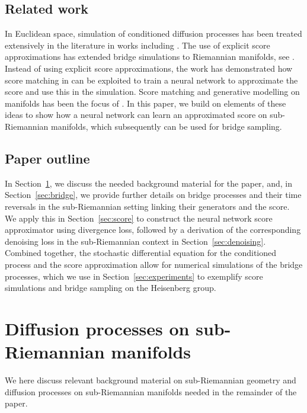 \documentclass[10pt]{amsart}
\theoremstyle{remark}
\numberwithin{equation}{section}
\begin{document}
\subsection{Related work}
In Euclidean space, simulation of conditioned diffusion processes has been treated extensively in the literature in works including \cite{durham2002,Stuart,BeskosPapaspiliopoulosRobertsFearnhead,delyonhu,beskos-mcmc-methods,GolightlyWilkinsonChapter,LinChenMykland,bridgesim3,bladt2016, whitaker2017,bridgesim6,bridgesim5, bierkens2020piecewise, mider2021continuous}.
The use of explicit score approximations has extended bridge simulations to Riemannian manifolds, see \cite{jensen2019simulation,JS21,jensen2022discrete,buiInferencePartiallyObserved2023,corstanjeSimulatingConditionedDiffusions2024}. Instead of using explicit score approximations, the work \cite{HdBDT21} has demonstrated how score matching in \cite{hyvarinenEstimationNonNormalizedStatistical2005,vincentConnectionScoreMatching2011} can be exploited to train a neural network to approximate the score and use this in the simulation. Score matching and generative modelling on manifolds has been the focus of \cite{huangRiemannianDiffusionModels2022,bortoliRiemannianScoreBasedGenerative2022}.
In this paper, we build on elements of these ideas to show how a neural network can learn an approximated score on sub-Riemannian manifolds, which subsequently can be used for bridge sampling.

\subsection{Paper outline}
In Section~\ref{sec:geometry_diffusion}, we discuss the needed background material for the paper, and, in Section~\ref{sec:bridge}, we provide further details on bridge processes and their time reversals in the sub-Riemannian setting linking their generators and the score. We apply this in Section~\ref{sec:score} to construct the neural network score approximator using divergence loss, followed by a derivation of the corresponding denoising loss in the sub-Riemannian context in Section~\ref{sec:denoising}. 
Combined together, the stochastic differential equation for the conditioned process and the score approximation allow for numerical simulations of the bridge processes, which we use in Section~\ref{sec:experiments} to exemplify score simulations and bridge sampling on the Heisenberg group.

\section{Diffusion processes on sub-Riemannian manifolds}
\label{sec:geometry_diffusion}
We here discuss relevant background material on sub-Riemannian geometry and diffusion processes on sub-Riemannian manifolds needed in the remainder of the paper.
\end{document}
